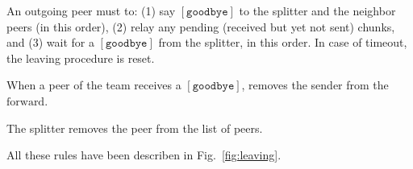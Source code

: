 \label{sec:leaving}

An outgoing peer must to: (1) say $[\mathtt{goodbye}]$ to the splitter
and the neighbor peers (in this order), (2) relay any pending
(received but yet not sent) chunks, and (3) wait for a
$[\mathtt{goodbye}]$ from the splitter, in this order. In case of
timeout, the leaving procedure is reset.

When a peer of the team receives a $[\mathtt{goodbye}]$, removes the
sender from the $\text{forward}$.

The splitter removes the peer from the list of peers.

\begin{figure*}
  \caption{Leaving a team.\label{fig:leaving}}
\end{figure*}

All these rules have been describen in Fig.~\ref{fig:leaving}.

\begin{comment}
An outgoing peer $P_o$ (see Fig.~\ref{fig:leaving}) must to: (1) say
$[\mathtt{goodbye}]$ to $S$ and to $T^o$ (in this order), (2)
relay any pending (received but yet not sent) chunks, and (3) wait for
a $[\mathtt{goodbye}]$ from $S$, which performs $T = T \setminus
P_o$. In case of a timeout, $P_o$ resets the leaving procedure,
for a maximum number of times.

When a $P_k$ receives a $[\mathtt{goodbye}]$ from $P_o$, $P_k$
removes $P_o$ from its neighbors set, by running $T^k = T^k
\setminus P_o$.
\end{comment}
